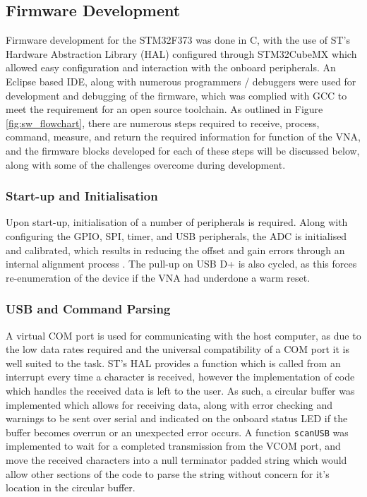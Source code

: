 \subsection{Firmware Development}
Firmware development for the STM32F373 was done in C, with the use of ST's Hardware Abstraction Library (HAL) configured through STM32CubeMX which allowed easy configuration and interaction with the onboard peripherals. An Eclipse based IDE, along with numerous programmers / debuggers were used for development and debugging of the firmware, which was complied with GCC to meet the requirement for an open source toolchain. As outlined in Figure \ref{fig:sw_flowchart}, there are numerous steps required to receive, process, command, measure, and return the required information for function of the VNA, and the firmware blocks developed for each of these steps will be discussed below, along with some of the challenges overcome during development. 

\subsubsection{Start-up and Initialisation}
Upon start-up, initialisation of a number of peripherals is required. Along with configuring the GPIO, SPI, timer, and USB peripherals, the ADC is initialised and calibrated, which results in reducing the offset and gain errors through an internal alignment process \cite{st_sdadc}. The pull-up on USB D+ is also cycled, as this forces re-enumeration of the device if the VNA had underdone a warm reset. 

\subsubsection{USB and Command Parsing}
A virtual COM port is used for communicating with the host computer, as due to the low data rates required and the universal compatibility of a COM port it is well suited to the task. ST's HAL provides a function which is called from an interrupt every time a character is received, however the implementation of code which handles the received data is left to the user. As such, a circular buffer was implemented which allows for receiving data, along with error checking and warnings to be sent over serial and indicated on the onboard status LED if the buffer becomes overrun or an unexpected error occurs. A function \texttt{scanUSB} was implemented to wait for a completed transmission from the VCOM port, and move the received characters into a null terminator padded string which would allow other sections of the code to parse the string without concern for it's location in the circular buffer. 

